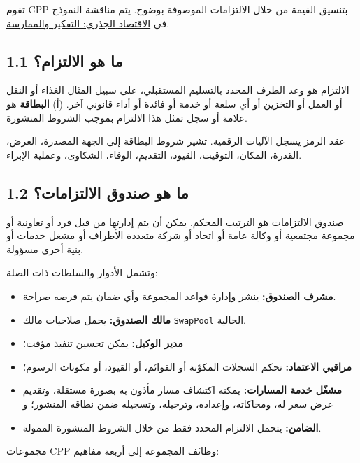 \documentclass[11pt]{article}
\begin{document}
تقوم CPP بتنسيق القيمة من خلال الالتزامات الموصوفة بوضوح. يتم مناقشة النموذج في \href{https://willruddick.substack.com/p/grassroots-economics-the-book-is}{الاقتصاد الجذري: التفكير والممارسة}.

\subsection*{1.1 ما هو الالتزام؟}

الالتزام هو وعد الطرف المحدد بالتسليم المستقبلي، على سبيل المثال الغذاء أو النقل أو العمل أو التخزين أو أي سلعة أو خدمة أو فائدة أو أداء قانوني آخر. (أ) \textbf{البطاقة} هو علامة أو سجل تمثل هذا الالتزام بموجب الشروط المنشورة.

عقد الرمز يسجل الآليات الرقمية. تشير شروط البطاقة إلى الجهة المصدرة، العرض، القدرة، المكان، التوقيت، القيود، التقديم، الوفاء، الشكاوى، وعملية الإبراء.

\subsection*{1.2 ما هو صندوق الالتزامات؟}

صندوق الالتزامات هو الترتيب المحكم. يمكن أن يتم إدارتها من قبل فرد أو تعاونية أو مجموعة مجتمعية أو وكالة عامة أو اتحاد أو شركة متعددة الأطراف أو مشغل خدمات أو بنية أخرى مسؤولة.

وتشمل الأدوار والسلطات ذات الصلة:

\begin{itemize}[leftmargin=*]
\item \textbf{مشرف الصندوق:} ينشر وإدارة قواعد المجموعة وأي ضمان يتم فرضه صراحة.
\item \textbf{مالك الصندوق:} يحمل صلاحيات مالك \texttt{SwapPool} الحالية.
\item \textbf{مدير الوكيل:} يمكن تحسين تنفيذ مؤقت؛
\item \textbf{مراقبي الاعتماد:} تحكم السجلات المكوّنة أو القوائم، أو القيود، أو مكونات الرسوم؛
\item \textbf{مشغّل خدمة المسارات:} يمكنه اكتشاف مسار مأذون به بصورة مستقلة، وتقديم عرض سعر له، ومحاكاته، وإعداده، وترحيله، وتسجيله ضمن نطاقه المنشور؛ و
\item \textbf{الضامن:} يتحمل الالتزام المحدد فقط من خلال الشروط المنشورة الممولة.
\end{itemize}
مجموعات CPP وظائف المجموعة إلى أربعة مفاهيم:
\end{document}

